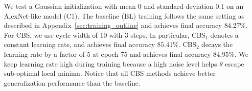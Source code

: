 We test a Gaussian initialization with mean $0$ and standard deviation $0.1$ on 
an AlexNet-like model (C1). The baseline (BL) training follows the same setting as described in 
Appendix~\ref{sec:training_outline} and achieves final accuracy $84.27\%$. For CBS, we use cycle width of 10 with 3 steps.
In particular, CBS$_1$ denotes a constant learning rate, and achieves final accuracy $85.41\%$. CBS$_2$ decays the learning rate by a factor of 5 at
epoch 75 and achieves final accuracy $84.95\%$. 
We keep learning rate high during training because a high noise 
level helps $\theta$ escape sub-optimal local minima. 
Notice that all CBS methods achieve better generalization performance than the baseline.
